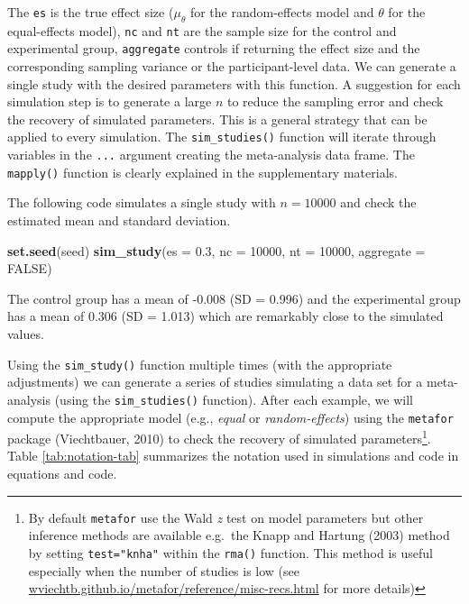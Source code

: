 \documentclass[
  man,floatsintext]{apa6}
\newenvironment{Shaded}{\begin{snugshade}}{\end{snugshade}}
\newcommand{\AttributeTok}[1]{\textcolor[rgb]{0.13,0.29,0.53}{#1}}
\newcommand{\ConstantTok}[1]{\textcolor[rgb]{0.56,0.35,0.01}{#1}}
\newcommand{\DecValTok}[1]{\textcolor[rgb]{0.00,0.00,0.81}{#1}}
\newcommand{\FloatTok}[1]{\textcolor[rgb]{0.00,0.00,0.81}{#1}}
\newcommand{\FunctionTok}[1]{\textcolor[rgb]{0.13,0.29,0.53}{\textbf{#1}}}
\newcommand{\NormalTok}[1]{#1}
\begin{document}
\normalsize

The \texttt{es} is the true effect size (\(\mu_{\theta}\) for the random-effects model and \(\theta\) for the equal-effects model), \texttt{nc} and \texttt{nt} are the sample size for the control and experimental group, \texttt{aggregate} controls if returning the effect size and the corresponding sampling variance or the participant-level data. We can generate a single study with the desired parameters with this function. A suggestion for each simulation step is to generate a large \(n\) to reduce the sampling error and check the recovery of simulated parameters. This is a general strategy that can be applied to every simulation. The \texttt{sim\_studies()} function will iterate through variables in the \texttt{...} argument creating the meta-analysis data frame. The \texttt{mapply()} function is clearly explained in the supplementary materials.

The following code simulates a single study with \(n = 10000\) and check the estimated mean and standard deviation.

\scriptsize

\begin{Shaded}
\begin{Highlighting}[]
\FunctionTok{set.seed}\NormalTok{(seed)}
\FunctionTok{sim\_study}\NormalTok{(}\AttributeTok{es =} \FloatTok{0.3}\NormalTok{, }\AttributeTok{nc =} \DecValTok{10000}\NormalTok{, }\AttributeTok{nt =} \DecValTok{10000}\NormalTok{, }\AttributeTok{aggregate =} \ConstantTok{FALSE}\NormalTok{)}
\end{Highlighting}
\end{Shaded}

\normalsize

\scriptsize

\normalsize

The control group has a mean of -0.008 (SD = 0.996) and the experimental group has a mean of 0.306 (SD = 1.013) which are remarkably close to the simulated values.

Using the \texttt{sim\_study()} function multiple times (with the appropriate adjustments) we can generate a series of studies simulating a data set for a meta-analysis (using the \texttt{sim\_studies()} function). After each example, we will compute the appropriate model (e.g., \emph{equal} or \emph{random-effects}) using the \texttt{metafor} package (Viechtbauer, 2010) to check the recovery of simulated parameters\footnote{ By default \texttt{metafor} use the Wald \emph{z} test on model parameters but other inference methods are available e.g.~the Knapp and Hartung (2003) method by setting \texttt{test="knha"} within the \texttt{rma()} function. This method is useful especially when the number of studies is low (see \href{https://wviechtb.github.io/metafor/reference/misc-recs.html}{wviechtb.github.io/metafor/reference/misc-recs.html} for more details)}. Table \ref{tab:notation-tab} summarizes the notation used in simulations and code in equations and code.
\end{document}
